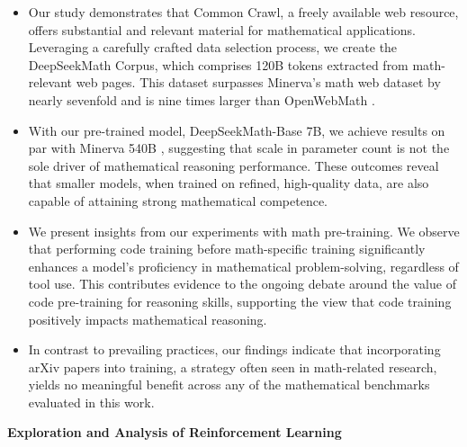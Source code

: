 \begin{itemize}[topsep=0pt]
    \item Our study demonstrates that Common Crawl, a freely available web resource, offers substantial and relevant material for mathematical applications. Leveraging a carefully crafted data selection process, we create the DeepSeekMath Corpus, which comprises 120B tokens extracted from math-relevant web pages. This dataset surpasses Minerva's math web dataset \citep{minerva} by nearly sevenfold and is nine times larger than OpenWebMath \citep{openwebmath}.

    \item With our pre-trained model, DeepSeekMath-Base 7B, we achieve results on par with Minerva 540B \citep{minerva}, suggesting that scale in parameter count is not the sole driver of mathematical reasoning performance. These outcomes reveal that smaller models, when trained on refined, high-quality data, are also capable of attaining strong mathematical competence.

    \item We present insights from our experiments with math pre-training. We observe that performing code training before math-specific training significantly enhances a model’s proficiency in mathematical problem-solving, regardless of tool use. This contributes evidence to the ongoing debate around the value of code pre-training for reasoning skills, supporting the view that code training positively impacts mathematical reasoning.

    \item In contrast to prevailing practices, our findings indicate that incorporating arXiv papers into training, a strategy often seen in math-related research, yields no meaningful benefit across any of the mathematical benchmarks evaluated in this work.
\end{itemize}

\textbf{Exploration and Analysis of Reinforcement Learning}

